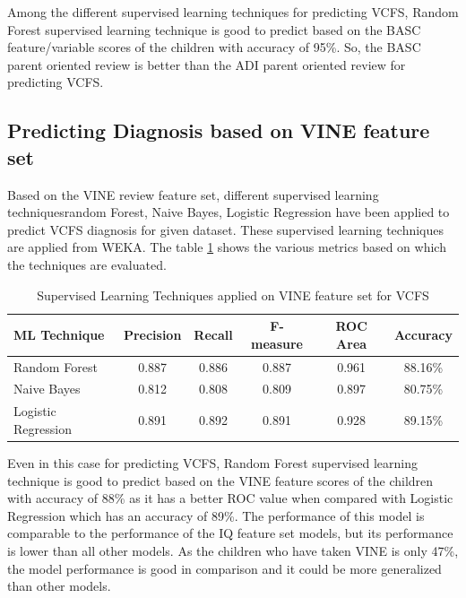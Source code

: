 Among the different supervised learning techniques for predicting VCFS, Random Forest supervised learning technique is good to predict based on the BASC feature/variable scores of the children with accuracy of 95\%. So, the BASC parent oriented review is better than the ADI parent oriented review for predicting VCFS.

\subsection{Predicting Diagnosis based on VINE feature set}
Based on the VINE review feature set, different supervised learning techniques{random Forest, Naive Bayes, Logistic Regression} have been applied to predict VCFS diagnosis for given dataset. These supervised learning techniques are applied from WEKA. The table \ref{table:618} shows the various metrics based on which the techniques are evaluated. 
\begin{table}[h]
\begin{center}
\begin{tabular}{|l|c|c|c|c|c|}
\hline
\textbf{ML Technique}&	\textbf{Precision}&	\textbf{Recall}&	\textbf{F-measure}&	\textbf{ROC Area}&	\textbf{Accuracy}\\
\hline \hline
Random Forest&0.887&	0.886&	0.887&	0.961&	88.16\%\\
\hline
Naive Bayes&0.812&	0.808&	0.809&	0.897&	80.75\%\\
\hline
Logistic Regression&0.891&	0.892&	0.891&	0.928&	89.15\%\\
\hline
\end{tabular}
\end{center}
\caption{Supervised Learning Techniques applied on VINE feature set for VCFS}
\label{table:618}
\end{table}

Even in this case for predicting VCFS, Random Forest supervised learning technique is good to predict based on the VINE feature scores of the children with accuracy of 88\% as it has a better ROC value when compared with Logistic Regression which has an accuracy of 89\%. The performance of this model is comparable to the performance of the IQ feature set models, but its performance is lower than all other models. As the children who have taken VINE is only 47\%, the model performance is good in comparison and it could be more generalized than other models.

